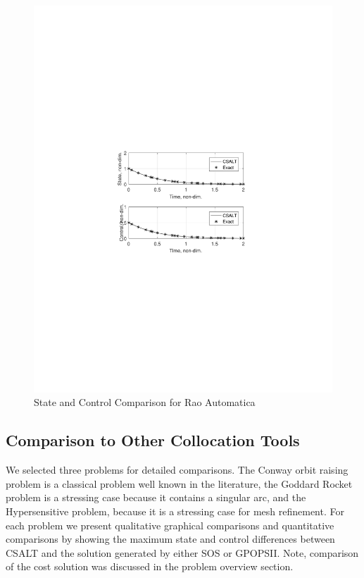 \documentclass[ISTS  ]{tjsass} %
\begin{document}
\begin{figure} [t!]
    \centering
    \includegraphics[width=\columnwidth]{../Figures/Rau_Compare}
    \caption{State and Control Comparison for Rao Automatica}
    \label{fig:rauCompare}
\end{figure}

\subsection{Comparison to Other Collocation Tools}

We selected three problems for detailed comparisons.   The Conway orbit raising problem is a classical problem well known in the literature, the Goddard Rocket problem is a stressing case because it contains a singular arc, and the Hypersensitive problem, because it is a stressing case for mesh refinement.   For each problem we present qualitative graphical comparisons and quantitative comparisons by showing the maximum state and control differences between CSALT and the solution generated by either SOS or GPOPSII.  Note, comparison of the cost solution was discussed in the problem overview section.
\end{document}
